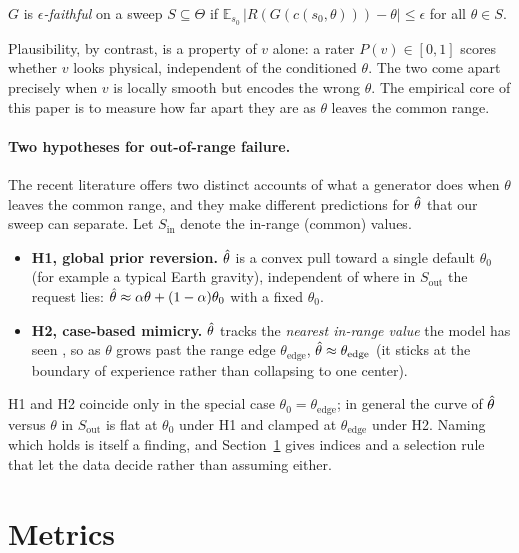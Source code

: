 \begin{definition}
$G$ is \emph{$\epsilon$-faithful} on a sweep $S\subseteq\Theta$ if
$\mathbb{E}_{s_0}\,|R(G(c(s_0,\theta)))-\theta| \le \epsilon$ for all
$\theta\in S$.
\end{definition}

Plausibility, by contrast, is a property of $v$ alone: a rater $P(v)\in[0,1]$
scores whether $v$ looks physical, independent of the conditioned $\theta$. The
two come apart precisely when $v$ is locally smooth but encodes the wrong
$\theta$. The empirical core of this paper is to measure how far apart they are
as $\theta$ leaves the common range.

\paragraph{Two hypotheses for out-of-range failure.}
The recent literature offers two distinct accounts of what a generator does
when $\theta$ leaves the common range, and they make different predictions for
$\hat{\theta}$ that our sweep can separate. Let $S_\text{in}$ denote the in-range
(common) values.
\begin{itemize}[leftmargin=1.4em,itemsep=2pt,topsep=2pt]
  \item \textbf{H1, global prior reversion.} $\hat{\theta}$ is a convex pull toward a
  single default $\theta_0$ (for example a typical Earth gravity), independent
  of where in $S_\text{out}$ the request lies:
  $\hat{\theta} \approx \alpha\theta + (1-\alpha)\theta_0$ with a fixed $\theta_0$.
  \item \textbf{H2, case-based mimicry.} $\hat{\theta}$ tracks the \emph{nearest
  in-range value} the model has seen \citep{kang2025howfar}, so as $\theta$ grows
  past the range edge $\theta_{\text{edge}}$, $\hat{\theta} \approx \theta_{\text{edge}}$
  (it sticks at the boundary of experience rather than collapsing to one center).
\end{itemize}
H1 and H2 coincide only in the special case $\theta_0=\theta_{\text{edge}}$;
in general the curve of $\hat{\theta}$ versus $\theta$ in $S_\text{out}$ is flat at
$\theta_0$ under H1 and clamped at $\theta_{\text{edge}}$ under H2. Naming which
holds is itself a finding, and Section~\ref{sec:metrics} gives indices and a
selection rule that let the data decide rather than assuming either.

\section{Metrics}
\label{sec:metrics}


